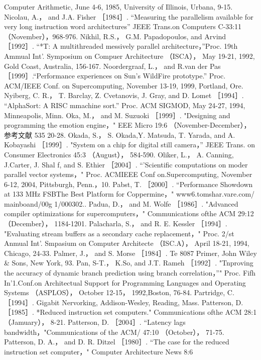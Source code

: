 Computer Arithmetic, June 4-6, 1985, University of Illinois, Urbana, 9-15.
Nicolau, A.， and J.A. Fisher ［1984］. “Measuring the parallelism available for very long instruction word architectures” JEEE
Trans.on Computers C-33:11 （November），968-976.
Nikhil, R.S.， G.M. Papadopoulos, and Arvind ［1992］. “*T: A multithreaded messively parallel architecture，”Proc. 19th Ammual
Int'. Symposium on Compuer Architecture （ISCA）， May 19-21, 1992, Gold Coast, Australia, 156-167.
Noordergraaf, L.， and R.van der Pas ［1999］.“Performance experiences on Sun's WildFire prototype.” Proc. ACM/IEEE Conf. on
Supercomputing, November 13-19, 1999, Portland, Ore.
Nyiberg, C. R.， T. Barclay, Z. Cvetanovis, J. Gray, and D. Lomet ［1994］. “AlphaSort: A RISC mmachine sort.” Proc. ACM
SIGMOD, May 24-27, 1994, Minneapolis, Minn.
Oka, M.， and M. Suzuoki ［1999］. "Designing and programming the emotion engine，" EEE Micro 19:6 （November-December），
参考文献
535
20-28.
Okada, S.， S. Okada,Y. Matsuda, T. Yarada, and A. Kobayashi ［1999］. "System on a chip for digital still camera，” JEEE Trans.
on Consumer Electronics 45:3 （August）， 584-590.
Oliker, L.， A. Canning, J.Carter, J. Shal f, and S. Ethier ［2004］. “'Scientific computations on moder parallel vector systems，" Proc.
ACMIEEE Conf on.Supercomputing, November 6-12, 2004, Pittsburgh, Penn.，10.
Pabst, T. ［2000］. “Performance Showdown at 133 MHz FSBThe Best Platform for Coppermine，" www6.tomshar.vare.com/
mainboand/00g 1/000302..
Padua, D.， and M. Wolfe ［1986］. "Advanced compiler optimizations for supercomputers，" Communications ofthe ACM 29:12
（December）， 1184-1201.
Palacharla, S.， and R. E. Kessler ［1994］. "Evaluating stream buffers as a secondary cache replacement，" Proc. 2/st Anmual Int'.
Smpasium on Computer Architecte （ISC.A）， April 18-21, 1994, Chicago, 24-33.
Palmer, J.， and S. Morse ［1984］. Te 8087 Primer, John Wiley & Sons, New York, 93.
Pan, S-T.， K.So, and J.T. Rameh ［1992］. "Tnproving the accuracy of dynamic branch prediction using branch correlation，”" Proc.
Fifh In'1.Conf.on Architectual Support for Programming Languages and Operating Systems （ASPLOS）， October 12-15，
1992,Boston, 76-84.
Partridge, C. ［1994］. Gigabit Nervorking, Addison-Wesley, Reading, Mass.
Patterson, D.［1985］. *Reduced instruction set computers." Communications ofthe ACM 28:1 （Jamuary）， 8-21.
Patterson, D. ［2004］. “Latency lags bandwidth，"Communications of the ACM/ 47:10 （October）， 71-75.
Patterson, D. A.， and D. R. Ditzel ［1980］. “The case for the reduced instruction set computer，" Computer Architecture News 8:6
